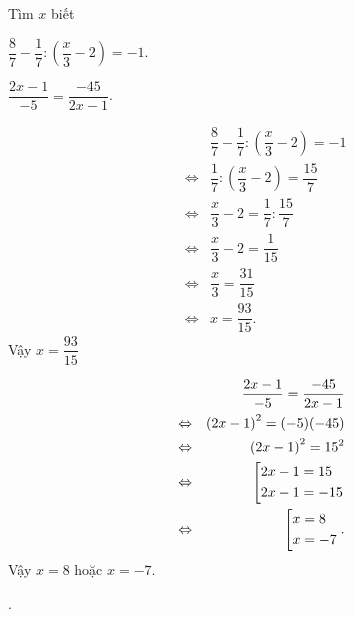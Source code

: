 		\begin{ex}%
			Tìm $x$ biết
				\begin{enumEX}{2}
				\item $\dfrac{8}{7}- \dfrac{1}{7}: \left(\dfrac{x}{3}- 2\right)= -1$.
				\item $\dfrac{2x-1}{-5}= \dfrac{-45}{2x- 1}$.
			\end{enumEX}
			\loigiai
			{
\begin{enumEX}{2}
\item 
\begin{eqnarray*}
		&&\dfrac{8}{7}- \dfrac{1}{7}: \left(\dfrac{x}{3}- 2\right)= -1\\
		&\Leftrightarrow & \dfrac{1}{7}: \left(\dfrac{x}{3}- 2\right)= \dfrac{15}{7}\\
		&\Leftrightarrow  & \dfrac{x}{3}- 2= \dfrac{1}{7}: \dfrac{15}{7}\\
		& \Leftrightarrow & \dfrac{x}{3}- 2= \dfrac{1}{15}\\
		& \Leftrightarrow & \dfrac{x}{3}= \dfrac{31}{15}\\
		& \Leftrightarrow & x= \dfrac{93}{15}.
	\end{eqnarray*}
Vậy $x= \dfrac{93}{15}$
	\item \begin{eqnarray*}
		&&\dfrac{2x-1}{-5}= \dfrac{-45}{2x- 1}\\
		&\Leftrightarrow & \left(2x- 1\right)^2= (-5)(-45)\\
		&\Leftrightarrow  & \left(2x- 1\right)^2= 15^2\\
		&\Leftrightarrow & \left[\begin{aligned}&2x- 1= 15\\ &2x-1= -15\end{aligned}\right.\\
		&\Leftrightarrow & \left[\begin{aligned}&x= 8\\ &x= -7\end{aligned}\right..
	\end{eqnarray*}
Vậy $x= 8$ hoặc $x= -7$.
\end{enumEX}.
			}
		\end{ex}
	
